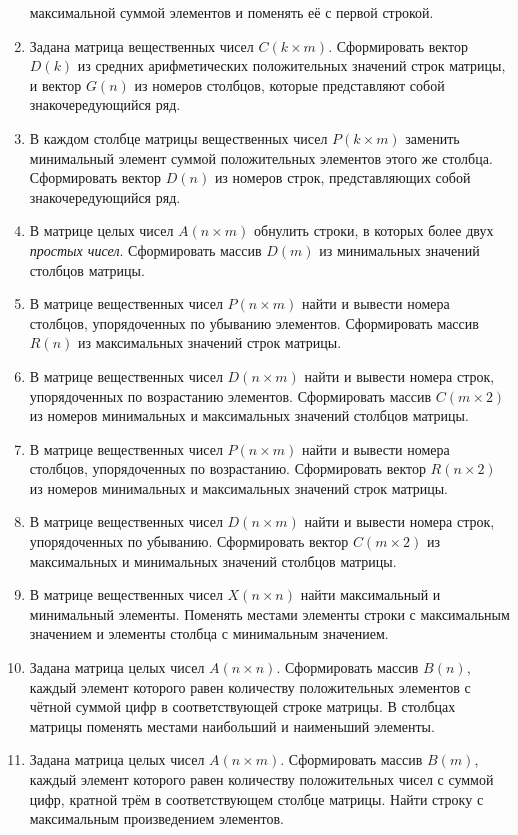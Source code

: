 \begin{enumerate}
максимальной суммой элементов и поменять её с первой строкой.
\item Задана матрица вещественных чисел $C(k\times m)$. Сформировать вектор
$D(k)$ из средних арифметических положительных значений строк матрицы, и вектор
$G(n)$ из номеров столбцов, которые представляют собой знакочередующийся ряд.
\item В каждом столбце матрицы вещественных чисел $P(k\times m)$ заменить
минимальный элемент суммой положительных элементов этого же столбца. Сформировать вектор
$D(n)$ из номеров строк, представляющих собой знакочередующийся ряд.
\item В матрице целых чисел $A(n\times m)$ обнулить строки, в которых более двух
\emph{простых чисел}. Сформировать массив $D(m)$ из минимальных значений столбцов матрицы.
\item В матрице вещественных чисел $P(n\times m)$ найти и вывести номера столбцов,
упорядоченных по убыванию элементов. Сформировать массив $R(n)$ из максимальных значений строк
матрицы.
\item В матрице вещественных чисел $D(n\times m)$ найти и вывести номера строк,
упорядоченных по возрастанию элементов. Сформировать массив $C(m\times 2)$ из
номеров  минимальных и максимальных значений столбцов матрицы.
\item В матрице вещественных чисел $P(n\times m)$ найти и вывести номера столбцов,
упорядоченных по возрастанию. Сформировать вектор $R(n\times 2)$ из номеров  минимальных и
максимальных значений строк матрицы. 
\item В матрице вещественных чисел $D(n\times m)$ найти и вывести номера строк,
упорядоченных по убыванию. Сформировать вектор $C(m\times 2)$ из максимальных и
минимальных значений столбцов матрицы.
\item В матрице вещественных чисел $X(n\times n)$ найти максимальный и минимальный элементы. Поменять
местами элементы строки с максимальным значением и элементы столбца с минимальным значением.
\item Задана матрица целых чисел $A(n\times n)$. Сформировать массив $B(n)$,
каждый элемент которого равен количеству положительных элементов с чётной суммой цифр в  соответствующей строке
матрицы. В столбцах матрицы поменять местами наибольший и наименьший элементы.
\item Задана матрица целых чисел $A(n\times m)$. Сформировать массив
$B(m)$, каждый элемент которого равен количеству положительных чисел с суммой цифр, кратной
трём в  соответствующем столбце матрицы. Найти строку с максимальным произведением элементов.

\end{enumerate}
